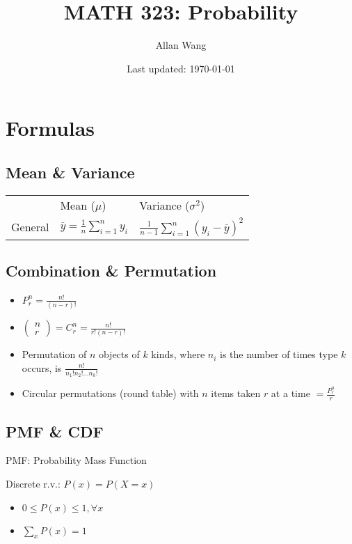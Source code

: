 \documentclass[12pt]{article}
\author{Allan Wang}
\date{Last updated: \today}
\title{MATH 323: Probability}
\newcommand\mm[1]{\begin{pmatrix}#1\end{pmatrix}}
\begin{document}
\onehalfspacing
\maketitle
\tableofcontents
\pagebreak

\section{Formulas}

\subsection{Mean \& Variance}

\begin{tabularx}{\textwidth}{l | X | X}
	& Mean ($\mu$) & Variance ($\sigma^2$) \\
	General & $\overline{y} = \frac{1}{n} \sum_{i = 1}^n y_i$ & $\frac{1}{n - 1} \sum_{i = 1}^n (y_i - \overline{y})^2$
\end{tabularx}

\subsection{Combination \& Permutation}

\begin{itemize}
	\item $P_r^n = \frac{n!}{(n - r)!}$
	\item $\mm{n \\ r} = C_r^n = \frac{n!}{r! (n - r)!}$
	\item Permutation of $n$ objects of $k$ kinds, where $n_i$ is the number of times type $k$ occurs, is $\frac{n!}{n_1! n_2! ... n_k!}$
	\item Circular permutations (round table) with $n$ items taken $r$ at a time $ = \frac{P_r^n}{r}$
\end{itemize}

\subsection{PMF \& CDF}

PMF: Probability Mass Function

Discrete r.v.: $P(x) = P(X = x)$

\begin{itemize}
	\item $0 \le P(x) \le 1, \forall x$
	\item $\sum_x P(x) = 1$
\end{itemize}
\end{document}
